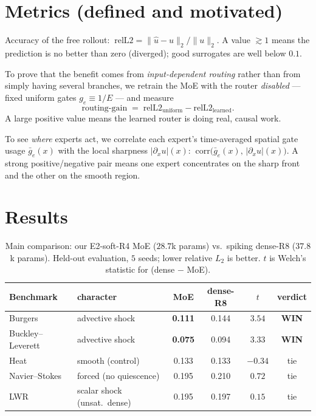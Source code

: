 \documentclass[11pt]{article}
\begin{document}
\section{Metrics (defined and motivated)}\label{sec:metrics}
\begin{description}[leftmargin=0pt,itemsep=4pt]
\item[Relative $L_2$ error.] Accuracy of the free rollout:
      $\ \mathrm{relL2}=\|\hat u-u\|_2/\|u\|_2$. A value $\gtrsim 1$ means the prediction is no better
      than zero (diverged); good surrogates are well below $0.1$.
\item[Routing-gain (causal control).] To prove that the benefit comes from \emph{input-dependent
      routing} rather than from simply having several branches, we retrain the MoE with the router
      \emph{disabled} --- fixed uniform gates $g_e\equiv 1/E$ --- and measure
      \begin{equation}
      \text{routing-gain} \;=\; \mathrm{relL2}_{\text{uniform}} - \mathrm{relL2}_{\text{learned}}.
      \end{equation}
      A large positive value means the learned router is doing real, causal work.
\item[Specialization correlation.] To see \emph{where} experts act, we correlate each expert's
      time-averaged spatial gate usage $\bar g_e(x)$ with the local sharpness $|\partial_x u|(x)$:
      $\ \mathrm{corr}\big(\bar g_e(x),\,|\partial_x u|(x)\big)$. A strong positive/negative pair means
      one expert concentrates on the sharp front and the other on the smooth region.
\end{description}

\section{Results}\label{sec:results}

\begin{table}[h]\centering
\caption{Main comparison: our E2-soft-R4 MoE ($28.7$k params) vs.\ spiking dense-R8 ($37.8$k params).
Held-out evaluation, $5$ seeds; lower relative $L_2$ is better. $t$ is Welch's statistic for
(dense $-$ MoE).}
\begin{tabular}{llcccc}
\toprule
Benchmark & character & MoE & dense-R8 & $t$ & verdict\\
\midrule
Burgers            & advective shock          & \textbf{0.111} & 0.144 & $3.54$ & \cellcolor{green!15}\textbf{WIN}\\
Buckley--Leverett  & advective shock          & \textbf{0.075} & 0.094 & $3.33$ & \cellcolor{green!15}\textbf{WIN}\\
Heat               & smooth (control)         & 0.133 & 0.133 & $-0.34$ & tie\\
Navier--Stokes     & forced (no quiescence)   & 0.195 & 0.210 & $0.72$ & tie\\
LWR                & scalar shock (unsat.\ dense) & 0.195 & 0.197 & $0.15$ & tie\\
\bottomrule
\end{tabular}
\end{table}
\end{document}
